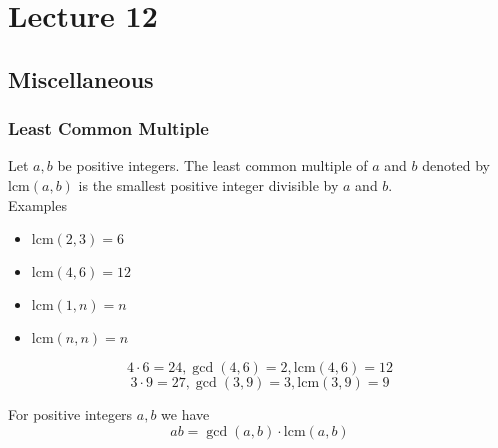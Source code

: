 \chapter{Lecture 12}
\date{October 8, 2024}

\section{Miscellaneous}
    \subsection{Least Common Multiple}
    \begin{definition}
        Let $a,b$ be positive integers. 
        The least common multiple of $a$ and $b$ denoted by 
        $\text{lcm}(a,b)$ is the smallest positive integer divisible by 
        $a$ and $b$. \\
        Examples
        \begin{itemize}
            \item $\text{lcm}(2,3)=6$
            \item $\text{lcm}(4,6)=12$
            \item $\text{lcm}(1,n)=n$
            \item $\text{lcm}(n,n)=n$
        \end{itemize}
        \[ 4\cdot 6 = 24, \gcd(4,6) = 2, \text{lcm}(4,6) = 12 \]
        \[ 3\cdot 9 = 27, \gcd(3,9) = 3, \text{lcm}(3,9) = 9 \]
        \begin{theorem}
            For positive integers $a,b$ we have 
            \[ ab = \gcd(a,b) \cdot \text{lcm}(a,b) \]
        \end{theorem}
    \end{definition}

